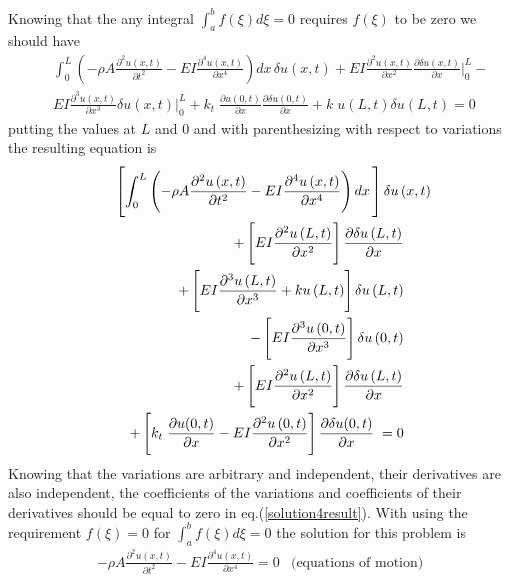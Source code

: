\documentclass[]{report}
\begin{document}
Knowing that the any integral $\int_{a}^{b} f\left(\xi\right)d \xi=0$ requires $f\left(\xi\right)$ to be zero we should have
\begin{eqnarray}
\nonumber
&& \int_{0}^{L}  \left(-\rho A \frac{\partial^2{ u\left(x,t\right)}}{\partial{t^2}} -E I\frac{\partial^4{u\left(x,t\right)}}{\partial{x^4}}\right)  dx\,{\delta u\left(x,t\right)} +E I\frac{\partial^2{u\left(x,t\right)}}{\partial{x^2}} \frac{\partial{\delta u\left(x,t\right)}}{\partial x}{|}_{0}^{L}-\\ &&E I\frac{\partial^3{u\left(x,t\right)}}{\partial{x^3}} {\delta u\left(x,t\right)}{|}_{0}^{L} +k_t  \; \frac{\partial{u{\left(0,t\right)}}}{\partial{x}} \frac{\partial{\delta u{\left(0,t\right)}}}{\partial{x}}+k  \;u \left(L,t\right) \delta  u \left(L,t\right) =0\nonumber
\end{eqnarray}
putting the values at $L$ and $0$ and with parenthesizing with respect to variations the resulting equation is
\begin{eqnarray}
\nonumber
\lefteqn{\left[ \int_{0}^{L}  \left(-\rho A \frac{\partial^2{ u\left(x,t\right)}}{\partial{t^2}} -E I\frac{\partial^4{u\left(x,t\right)}}{\partial{x^4}}\right)  dx\, \right]{\delta u\left(x,t\right)} }\\
&&+\left[E I\frac{\partial^2{u\left(L,t\right)}}{\partial{x^2}} \right]\frac{\partial{\delta u\left(L,t\right)}}{\partial x}\nonumber\\ 
&&+\left[E I\frac{\partial^3{u\left(L,t\right)}}{\partial{x^3}}+k u \left(L,t\right) \right] {\delta u\left(L,t\right)}\label{solution4result} \\
&&-\left[E I\frac{\partial^3{u\left(0,t\right)}}{\partial{x^3}} \right] {\delta u\left(0,t\right)}\nonumber\\
&&+\left[E I\frac{\partial^2{u\left(L,t\right)}}{\partial{x^2}} \right]\frac{\partial{\delta u\left(L,t\right)}}{\partial x}\nonumber\\ 
&&+\left[k_t  \; \frac{\partial{u{\left(0,t\right)}}}{\partial{x}} -E I\frac{\partial^2{u\left(0,t\right)}}{\partial{x^2}}\right]\frac{\partial{\delta u{\left(0,t\right)}}}{\partial{x}}  \; =0\nonumber
\end{eqnarray}
Knowing that the variations are arbitrary and independent, their derivatives are also independent, the coefficients of the variations and coefficients of their derivatives should be equal to zero in eq.(\ref{solution4result}). With using the requirement $f\left(\xi\right)=0$ for $\int_{a}^{b} f\left(\xi\right)d \xi=0$ the solution for this problem is
\begin{eqnarray}
-\rho A \frac{\partial^2{ u\left(x,t\right)}}{\partial{t^2}} -E I\frac{\partial^4{u\left(x,t\right)}}{\partial{x^4}}=0 \nonumber & \text{(equations of motion)}
\end{eqnarray}
\end{document}
